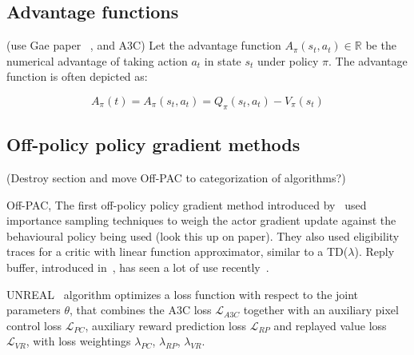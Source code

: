 \documentclass{../main.tex}{}
\begin{document}
\subsection{Advantage functions}
(use Gae paper ~\citep{Schulman2015a}, and A3C)
Let the advantage function $A_{\pi}(s_t, a_t) \in \mathbb{R}$ be the numerical advantage of taking action $a_t$ in state $s_t$ under policy $\pi$. The advantage function is often depicted as:

\begin{equation}
A_{\pi}(t) = A_{\pi}(s_t, a_t) = Q_{\pi}(s_t, a_t) - V_{\pi}(s_t)
\end{equation}

\subsection{Off-policy policy gradient methods}
(Destroy section and move Off-PAC to categorization of algorithms?)

Off-PAC, The first off-policy policy gradient method introduced by~\cite{Degris2012} used importance sampling techniques to weigh the actor gradient update against the behavioural policy being used (look this up on paper). They also used eligibility traces for a critic with linear function approximator, similar to a TD($\lambda$). Reply buffer, introduced in~\cite{Lin1993}, has seen a lot of use recently~\citep{Mnih2013, Mnih2016}. %


UNREAL~\citep{Jaderberg2016} algorithm optimizes a loss function with respect to the joint parameters $\theta$, that combines the A3C loss $\mathcal{L}_{A3C}$ together with an auxiliary pixel control loss $\mathcal{L}_{PC}$, auxiliary reward prediction loss $\mathcal{L}_{RP}$ and replayed value loss $\mathcal{L}_{VR}$, with loss weightings $\lambda_{PC}$, $\lambda_{RP}$, $\lambda_{VR}$.


\end{document}
